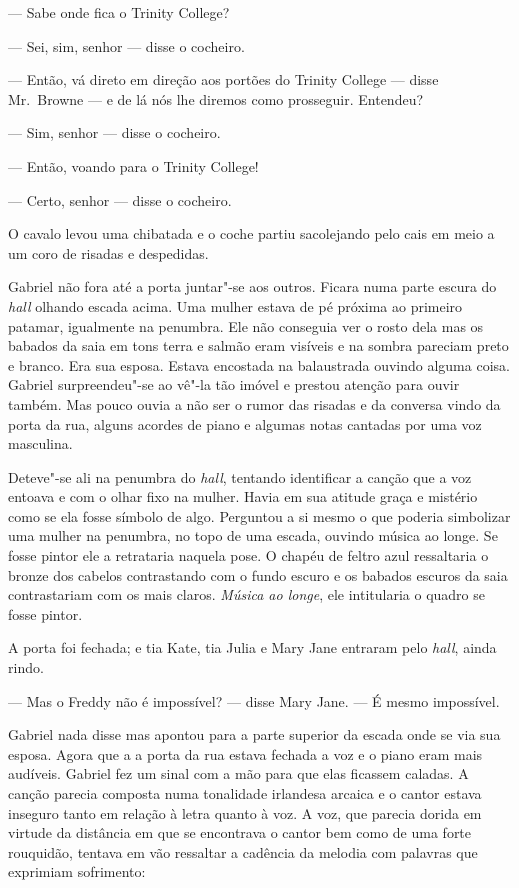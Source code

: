 --- Sabe onde fica o Trinity College?

--- Sei, sim, senhor --- disse o cocheiro.

--- Então, vá direto em direção aos portões do Trinity College --- disse 
Mr.~Browne --- e de lá nós lhe diremos como prosseguir.  Entendeu?

--- Sim, senhor --- disse o cocheiro.

--- Então, voando para o Trinity College!

--- Certo, senhor --- disse o cocheiro.

O cavalo levou uma chibatada e o coche partiu sacolejando pelo cais em meio a
um coro de risadas e despedidas.

Gabriel não fora até a porta juntar"-se aos outros.  Ficara numa parte escura do
\textit{hall} olhando escada acima.  Uma mulher estava de pé próxima ao
primeiro patamar, igualmente na penumbra.  Ele não conseguia ver o rosto dela
mas os babados da saia em tons terra e salmão eram visíveis e na sombra
pareciam preto e branco.  Era sua esposa.  Estava encostada na balaustrada
ouvindo alguma coisa.  Gabriel surpreendeu"-se ao vê"-la tão imóvel e prestou
atenção para ouvir também.  Mas pouco ouvia a não ser o rumor das risadas e da
conversa vindo da porta da rua, alguns acordes de piano e algumas notas
cantadas por uma voz masculina.

Deteve"-se ali na penumbra do \textit{hall}, tentando identificar a canção
que a voz entoava e com o olhar fixo na mulher.  Havia em sua atitude graça e
mistério como se ela fosse símbolo de algo.  Perguntou a si mesmo o que poderia
simbolizar uma mulher na penumbra, no topo de uma escada, ouvindo música ao
longe.  Se fosse pintor ele a retrataria naquela pose.  O chapéu de feltro azul
ressaltaria o bronze dos cabelos contrastando com o fundo escuro e os babados
escuros da saia contrastariam com os mais claros.  \textit{Música ao longe},
ele intitularia o quadro se fosse pintor.

A porta foi fechada; e tia Kate, tia Julia e Mary Jane entraram pelo
\textit{hall}, ainda rindo.

--- Mas o Freddy não é impossível? --- disse Mary Jane.  --- É mesmo
impossível.

Gabriel nada disse mas apontou para a parte superior da escada onde se via sua
esposa.  Agora que a a porta da rua estava fechada a voz e o piano eram mais
audíveis.  Gabriel fez um sinal com a mão para que elas ficassem caladas.  A
canção parecia composta numa tonalidade irlandesa arcaica e o cantor estava
inseguro tanto em relação à letra quanto à voz.  A voz, que parecia dorida em
virtude da distância em que se encontrava o cantor bem como de uma forte
rouquidão, tentava em vão ressaltar a cadência da melodia com palavras que
exprimiam sofrimento:

